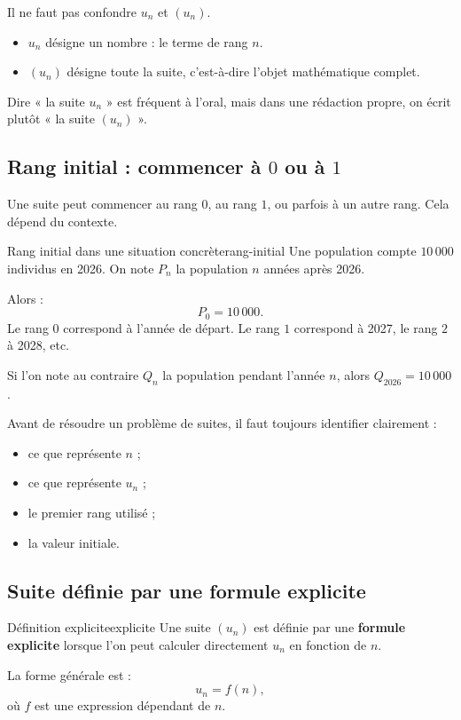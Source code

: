 \documentclass[11pt,a4paper]{article}
\begin{document}
\begin{warningbox}
Il ne faut pas confondre $u_n$ et $(u_n)$.
\begin{itemize}
  \item $u_n$ désigne un nombre : le terme de rang $n$.
  \item $(u_n)$ désigne toute la suite, c'est-à-dire l'objet mathématique complet.
\end{itemize}
Dire « la suite $u_n$ » est fréquent à l'oral, mais dans une rédaction propre, on écrit plutôt « la suite $(u_n)$ ».
\end{warningbox}

\subsection{Rang initial : commencer à $0$ ou à $1$}

Une suite peut commencer au rang $0$, au rang $1$, ou parfois à un autre rang. Cela dépend du contexte.

\begin{examplebox}{Rang initial dans une situation concrète}{rang-initial}
Une population compte $10\,000$ individus en 2026. On note $P_n$ la population $n$ années après 2026.

Alors :
\[
P_0=10\,000.
\]
Le rang $0$ correspond à l'année de départ. Le rang $1$ correspond à 2027, le rang $2$ à 2028, etc.

Si l'on note au contraire $Q_n$ la population pendant l'année $n$, alors $Q_{2026}=10\,000$.
\end{examplebox}

\begin{rememberbox}
Avant de résoudre un problème de suites, il faut toujours identifier clairement :
\begin{itemize}
  \item ce que représente $n$ ;
  \item ce que représente $u_n$ ;
  \item le premier rang utilisé ;
  \item la valeur initiale.
\end{itemize}
\end{rememberbox}

\subsection{Suite définie par une formule explicite}

\begin{definitionbox}{Définition explicite}{explicite}
Une suite $(u_n)$ est définie par une \textbf{formule explicite} lorsque l'on peut calculer directement $u_n$ en fonction de $n$.

La forme générale est :
\[
 u_n=f(n),
\]
où $f$ est une expression dépendant de $n$.
\end{definitionbox}
\end{document}

